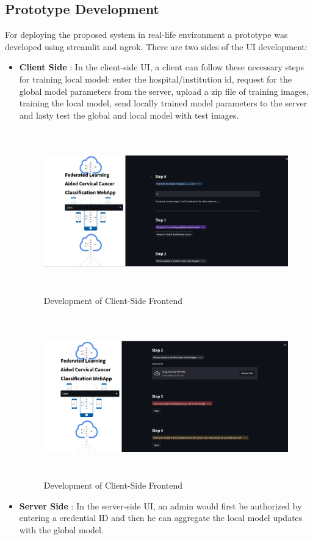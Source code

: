 \subsection{Prototype Development}
For deploying the proposed system in real-life environment a prototype was developed using streamlit and ngrok. There are two sides of the UI development: 
\begin{itemize}
    \item \textbf{Client Side} : In the client-side UI, a client can follow these necessary steps for training local model: enter the hospital/institution id, request for the global model parameters from the server, upload a zip file of training images, training the local model, send locally trained model parameters to the server and lasty test the global and local model with test images. 

    \begin{figure}[H]
    \centering
    \includegraphics[width=160mm,height=70mm]{figures/frontend1.png}
    \caption{Development of Client-Side Frontend}
    \label{DLAccuracy}
    \end{figure}
    
    \begin{figure}[H]
    \centering
    \includegraphics[width=160mm,height=70mm]{figures/frontend2.png}
    \caption{Development of Client-Side Frontend}
    \label{DLAccuracy}
    \end{figure}
    \item \textbf{Server Side} : In the server-side UI, an admin would first be authorized by entering a credential ID and then he can aggregate the local model updates with the global model.  
    

\end{itemize}
